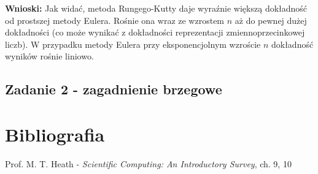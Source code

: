 \documentclass{article}
\begin{document}
\vspace{5mm}
\noindent
\textbf{Wnioski:} Jak widać, metoda Rungego-Kutty daje wyraźnie większą dokładność od prostszej metody Eulera. Rośnie ona wraz ze wzrostem \(n\) aż do pewnej dużej dokładności (co może wynikać z dokładności reprezentacji zmiennoprzecinkowej liczb). W przypadku metody Eulera przy eksponencjolnym wzroście \(n\) dokładność wyników rośnie liniowo.

\newpage

\subsection{Zadanie 2 - zagadnienie brzegowe}

\section{Bibliografia}
Prof. M. T. Heath - \textit{Scientific Computing: An Introductory Survey}, ch. 9, 10
\end{document}

